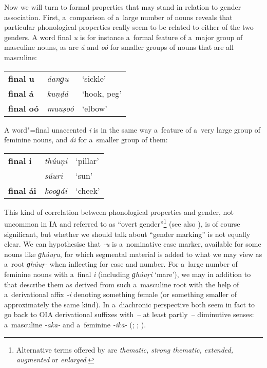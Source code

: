 Now we will turn to formal properties that may stand in relation to gender association. First, a~comparison of a~large number of nouns reveals that particular phonological properties really seem to be related to either of the two genders. A word final \textit{u} is for instance a~formal feature of a~major group of masculine nouns, as are \textit{á} and \textit{oó} for smaller groups of nouns that are all masculine:



\begin{table}[H]
\begin{tabularx}{\textwidth}{ l l l }
\textbf{final u} &
\textit{áanɡu} &
`sickle'\\
\textbf{final á} &
\textit{kuṇḍá} &
`hook, peg'\\
\textbf{final oó} &
\textit{muuṣoó} &
`elbow'\\
\end{tabularx}
\end{table}

A word"=final unaccented \textit{i} is in the same way a~feature of a~very large group of feminine nouns, and \textit{ái} for a~smaller group of them:


\begin{table}[H]
\begin{tabularx}{\textwidth}{ l l l }
\textbf{final i} &
\textit{thúuṇi} &
`pillar'\\
&
\textit{súuri} &
`sun'\\
\textbf{final ái} &
\textit{kooɡái} &
`cheek'\\
\end{tabularx}
\end{table}

This kind of correlation between phonological properties and gender, not uncommon in IA \citep[219]{masica1991} and referred to as ``overt gender''\footnote{Alternative terms offered by \citet[219]{masica1991} are \textit{thematic, strong thematic, extended, augmented} or \textit{enlarged}.} (see also \citealt[44, 62]{corbett1991}), is of course significant, but whether we should talk about ``gender marking'' is not equally clear. We can hypothesise that \textit{-u} is a~nominative case marker, available for some nouns like \textit{ɡhúuṛu}, for which segmental material is added to what we may view as a~root \textit{ɡhúuṛ-} when inflecting for case and number. For a~large number of feminine nouns with a~final \textit{i} (including \textit{ɡhúuṛi} `mare'), we may in addition to that describe them as derived from such a~masculine root with the help of a~derivational affix \textit{-i} denoting something female (or something smaller of approximately the same kind). In a~diachronic perspective both seem in fact to go back to OIA derivational suffixes with~-- at least partly~-- diminutive senses: a~masculine \textit{-aka-} and a~feminine \textit{-ikā-} (\citealt[222]{masica1991}; \citealt[15]{morgenstierne1941}; \citealt[29]{buddruss1967}).


